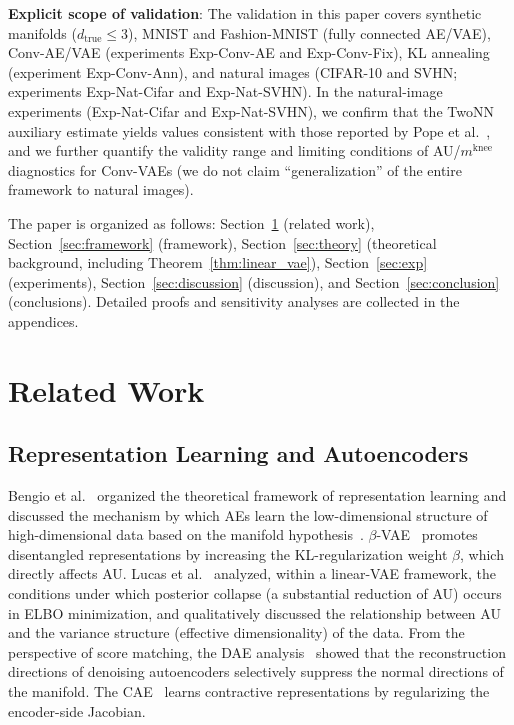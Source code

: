 \documentclass[make,article,submit,pdftex,moreauthors]{Definitions/mdpi}
\newcommand{\mknee}{m^{\mathrm{knee}}}
\begin{document}
\textbf{Explicit scope of validation}:
The validation in this paper covers synthetic manifolds
($d_{\mathrm{true}} \leq 3$), MNIST and Fashion-MNIST (fully connected AE/VAE),
Conv-AE/VAE (experiments Exp-Conv-AE and Exp-Conv-Fix), KL annealing
(experiment Exp-Conv-Ann),
and natural images (CIFAR-10 and SVHN; experiments Exp-Nat-Cifar and Exp-Nat-SVHN).
In the natural-image experiments (Exp-Nat-Cifar and Exp-Nat-SVHN), we confirm
that the TwoNN auxiliary estimate yields values consistent with those reported
by Pope et al.~\cite{pope2021intrinsic}, and we further quantify the validity
range and limiting conditions of AU/$\mknee$ diagnostics for Conv-VAEs
(we do not claim ``generalization'' of the entire framework to natural images).

The paper is organized as follows:
Section~\ref{sec:related} (related work), Section~\ref{sec:framework} (framework),
Section~\ref{sec:theory} (theoretical background, including Theorem~\ref{thm:linear_vae}),
Section~\ref{sec:exp} (experiments), Section~\ref{sec:discussion} (discussion),
and Section~\ref{sec:conclusion} (conclusions).
Detailed proofs and sensitivity analyses are collected in the appendices.

\section{Related Work}\label{sec:related}

\subsection{Representation Learning and Autoencoders}\label{sec:related_ae}

Bengio et al.~\cite{bengio2013representation} organized the theoretical
framework of representation learning and discussed the mechanism by which AEs
learn the low-dimensional structure of high-dimensional data based on the
manifold hypothesis~\cite{fefferman2016manifold}.
$\beta$-VAE~\cite{higgins2017betavae} promotes disentangled representations by
increasing the KL-regularization weight $\beta$, which directly affects AU.
Lucas et al.~\cite{lucas2019elbo} analyzed, within a linear-VAE framework, the
conditions under which posterior collapse (a substantial reduction of AU)
occurs in ELBO minimization, and qualitatively discussed the relationship
between AU and the variance structure (effective dimensionality) of the data.
From the perspective of score matching, the DAE analysis~\cite{alain2014dae}
showed that the reconstruction directions of denoising autoencoders selectively
suppress the normal directions of the manifold.
The CAE~\cite{rifai2011cae} learns contractive representations by regularizing
the encoder-side Jacobian.
\end{document}
